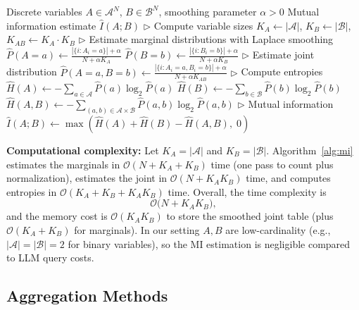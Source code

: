 \documentclass{article}
\theoremstyle{plain}
\theoremstyle{definition}
\theoremstyle{remark}
\begin{document}
\begin{algorithm}[ht]
\caption{Smoothed Mutual Information Estimation}
\label{alg:mi}
\begin{algorithmic}[1]
\REQUIRE Discrete variables $A \in \mathcal{A}^N$, $B \in \mathcal{B}^N$, smoothing parameter $\alpha > 0$
\ENSURE Mutual information estimate $\hat{I}(A; B)$
\STATE \hfill $\triangleright$ Compute variable sizes
\STATE $K_A \leftarrow |\mathcal{A}|$, $K_B \leftarrow |\mathcal{B}|$, $K_{AB} \leftarrow K_A \cdot K_B$
\STATE
\STATE \hfill $\triangleright$ Estimate marginal distributions with Laplace smoothing
    \STATE $\hat{P}(A = a) \leftarrow \frac{|\{i : A_i = a\}| + \alpha}{N + \alpha K_A}$
\ENDFOR
{}
    \STATE $\hat{P}(B = b) \leftarrow \frac{|\{i : B_i = b\}| + \alpha}{N + \alpha K_B}$
\ENDFOR
\STATE
\STATE \hfill $\triangleright$ Estimate joint distribution
    \STATE $\hat{P}(A = a, B = b) \leftarrow \frac{|\{i : A_i = a, B_i = b\}| + \alpha}{N + \alpha K_{AB}}$
\ENDFOR
\STATE
\STATE \hfill $\triangleright$ Compute entropies
\STATE $\hat{H}(A) \leftarrow -\sum_{a \in \mathcal{A}} \hat{P}(a) \log_2 \hat{P}(a)$
\STATE $\hat{H}(B) \leftarrow -\sum_{b \in \mathcal{B}} \hat{P}(b) \log_2 \hat{P}(b)$
\STATE $\hat{H}(A, B) \leftarrow -\sum_{(a,b) \in \mathcal{A} \times \mathcal{B}} \hat{P}(a, b) \log_2 \hat{P}(a, b)$
\STATE
\STATE \hfill $\triangleright$ Mutual information
\STATE $\hat{I}(A; B) \leftarrow \max\left( \hat{H}(A) + \hat{H}(B) - \hat{H}(A, B), \; 0 \right)$
\end{algorithmic}
\end{algorithm}

\noindent\textbf{Computational complexity:}
Let $K_A=|\mathcal{A}|$ and $K_B=|\mathcal{B}|$. Algorithm~\ref{alg:mi} estimates the marginals in $\mathcal{O}(N + K_A + K_B)$ time (one pass to count plus normalization), estimates the joint in $\mathcal{O}(N + K_AK_B)$ time, and computes entropies in $\mathcal{O}(K_A + K_B + K_AK_B)$ time. Overall, the time complexity is
\[
\mathcal{O}\bigl(N + K_AK_B\bigr),
\]
and the memory cost is $\mathcal{O}(K_AK_B)$ to store the smoothed joint table (plus $\mathcal{O}(K_A+K_B)$ for marginals).
In our setting $A,B$ are low-cardinality (e.g., $|\mathcal{A}|=|\mathcal{B}|=2$ for binary variables), so the MI estimation is negligible compared to LLM query costs.


\newpage
\subsection{Aggregation Methods}
\end{document}
